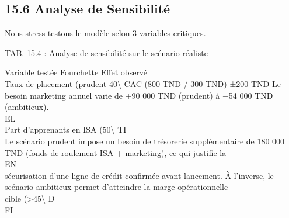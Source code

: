 \subsection{15.6 Analyse de Sensibilité}
Nous stress-testons le modèle selon 3 variables critiques.\\
\vspace{0.5em}
\begin{center}\begin{tabular}TAB. 15.4 : Analyse de sensibilité sur le scénario réaliste\end{tabular}\end{center}
\vspace{0.5em}
Variable testée                                 Fourchette Effet observé\\
Taux de placement (prudent 40\textbackslash{}%
CAC (800 TND / 300 TND)                         ±200 TND Le besoin marketing annuel varie de +90 000 TND (prudent) à −54 000 TND (ambitieux).\\
\vspace{0.5em}
\vspace{0.5em}
\vspace{0.5em}
\vspace{0.5em}
EL\\
Part d’apprenants en ISA (50\textbackslash{}%
\vspace{0.5em}
\vspace{0.5em}
\vspace{0.5em}
\vspace{0.5em}
TI\\
Le scénario prudent impose un besoin de trésorerie supplémentaire de 180 000 TND (fonds de roulement ISA + marketing), ce qui justifie la\\
\vspace{0.5em}
\vspace{0.5em}
\vspace{0.5em}
\vspace{0.5em}
EN\\
sécurisation d’une ligne de crédit confirmée avant lancement. À l’inverse, le scénario ambitieux permet d’atteindre la marge opérationnelle\\
cible (\textgreater{}45\textbackslash{}%
\vspace{0.5em}
\vspace{0.5em}
\vspace{0.5em}
\vspace{0.5em}
D\\
FI\\
